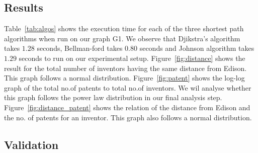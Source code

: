 \subsection{Results}
Table~\ref{tab:algos} shows the execution time for each of the three shortest
path algorithms  when run on our graph G1. We observe that Djikstra's
algorithm takes $1.28$ seconds, Bellman-ford takes $0.80$ seconds and Johnson
algorithm takes $1.29$ seconds to run on our experimental setup.
Figure~\ref{fig:distance} shows the result for the total number of inventors
having the same distance from Edison. This graph follows a normal
distribution. Figure~\ref{fig:patent} shows the log-log graph of the total
no.of patents to total no.of inventors. We wil analyse whether this graph
follows the power law distribution in our  final analysis step.
Figure~\ref{fig:distance_patent} shows the relation of the distance from
Edison and the no. of patents for an inventor. This graph also follows a
normal distribution.

\subsection{Validation}


